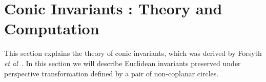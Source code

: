 \documentclass{bmvc2k}
\newcommand{\parmessage}[1]{\textcolor{cyan}{[Paragraph: #1]}}
\newcommand{\yuji}[1]{\textcolor{magenta}{[Yuji: #1]}}
\def\etal{\emph{et al}\bmvaOneDot}
\begin{document}


\section{Conic Invariants : Theory and Computation}
\label{Sec:ConicInv}
This section explains the theory of conic invariants, which was derived by Forsyth \etal~\cite{forsyth_91}.
In this section we will describe Euclidean invariants preserved under perspective transformation defined by a pair of non-coplanar circles.
\end{document}
